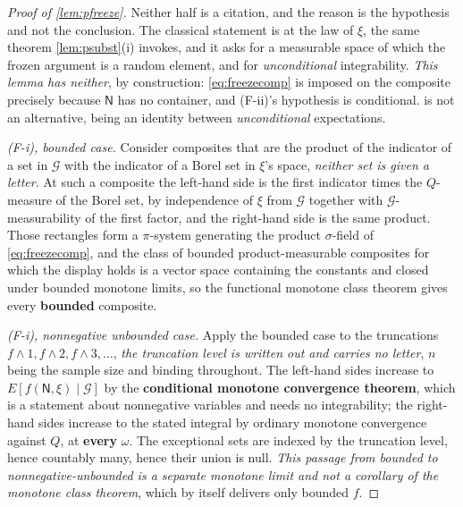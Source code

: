 \begin{proof}[Proof of \cref{lem:pfreeze}]
Neither half is a citation, and the reason is the hypothesis and not the conclusion. The classical
statement is \citet[Thm.~5.4]{kallenberg1997} at the law of $\xi$, the same theorem
\cref{lem:psubst}(i) invokes, and it asks for a measurable space of which the frozen argument is a
random element, and for \emph{unconditional} integrability. \emph{This lemma has neither}, by
construction: \eqref{eq:freezecomp} is imposed on the composite precisely because $\mathsf N$ has no
container, and \textup{(F-ii)}'s hypothesis is conditional. \citet[Lem.~2.11]{kallenberg1997} is not an
alternative, being an identity between \emph{unconditional} expectations.

\emph{\textup{(F-i)}, bounded case.} Consider composites that are the product of the indicator of a set in
$\mathcal G$ with the indicator of a Borel set in $\xi$'s space, \emph{neither set is given a letter}.
At such a composite the left-hand side is the first indicator times the
$Q$-measure of the Borel set, by independence of $\xi$ from $\mathcal G$ together with
$\mathcal G$-measurability of the first factor, and the right-hand side is the same product. Those
rectangles form a $\pi$-system generating the product $\sigma$-field of \eqref{eq:freezecomp}, and the
class of bounded product-measurable composites for which the display holds is a vector space containing
the constants and closed under bounded monotone limits, so the functional monotone class theorem gives
every \textbf{bounded} composite.

\emph{\textup{(F-i)}, nonnegative unbounded case.} Apply the bounded case to the truncations
$f\wedge1,f\wedge2,f\wedge3,\dots$, \emph{the truncation level is written out and carries no letter},
$n$ being the sample size and binding throughout. The left-hand sides increase to
$E[f(\mathsf N,\xi)\mid\mathcal G]$ by the \textbf{conditional monotone convergence theorem}, which is a statement
about nonnegative variables and needs no integrability; the right-hand sides increase to the stated
integral by ordinary monotone convergence against $Q$, at \textbf{every} $\omega$. The exceptional sets
are indexed by the truncation level, hence countably many, hence their union is null. \emph{This passage
from bounded to nonnegative-unbounded is a separate monotone limit and not a corollary of the monotone
class theorem}, which by itself delivers only bounded $f$.


\end{proof}
